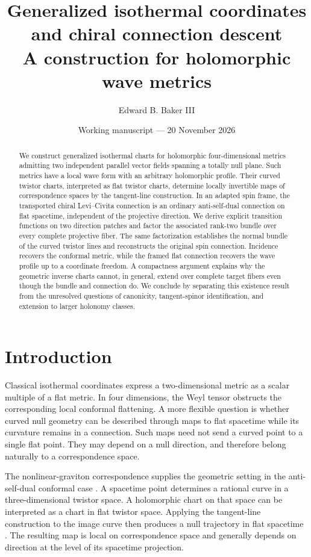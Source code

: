 \documentclass[11pt]{article}
\title{Generalized isothermal coordinates and chiral connection descent\\[3pt]
\large A construction for holomorphic wave metrics}
\author{Edward B. Baker III}
\date{Working manuscript --- 20 November 2026}
\numberwithin{equation}{section}
\theoremstyle{definition}
\theoremstyle{remark}
\begin{document}
\maketitle
\thispagestyle{plain}

\begin{abstract}
We construct generalized isothermal charts for holomorphic four-dimensional metrics admitting two independent parallel vector fields spanning a totally null plane. Such metrics have a local wave form with an arbitrary holomorphic profile. Their curved twistor charts, interpreted as flat twistor charts, determine locally invertible maps of correspondence spaces by the tangent-line construction. In an adapted spin frame, the transported chiral Levi--Civita connection is an ordinary anti-self-dual connection on flat spacetime, independent of the projective direction. We derive explicit transition functions on two direction patches and factor the associated rank-two bundle over every complete projective fiber. The same factorization establishes the normal bundle of the curved twistor lines and reconstructs the original spin connection. Incidence recovers the conformal metric, while the framed flat connection recovers the wave profile up to a coordinate freedom. A compactness argument explains why the geometric inverse charts cannot, in general, extend over complete target fibers even though the bundle and connection do. We conclude by separating this existence result from the unresolved questions of canonicity, tangent-spinor identification, and extension to larger holonomy classes.
\end{abstract}

\tableofcontents

\section{Introduction}

Classical isothermal coordinates express a two-dimensional metric as a scalar multiple of a flat metric. In four dimensions, the Weyl tensor obstructs the corresponding local conformal flattening. A more flexible question is whether curved null geometry can be described through maps to flat spacetime while its curvature remains in a connection. Such maps need not send a curved point to a single flat point. They may depend on a null direction, and therefore belong naturally to a correspondence space.

The nonlinear-graviton correspondence supplies the geometric setting in the anti-self-dual conformal case \cite{Penrose,AHS}. A spacetime point determines a rational curve in a three-dimensional twistor space. A holomorphic chart on that space can be interpreted as a chart in flat twistor space. Applying the tangent-line construction to the image curve then produces a null trajectory in flat spacetime \cite{Shaw}. The resulting map is local on correspondence space and generally depends on direction at the level of its spacetime projection.
\end{document}
